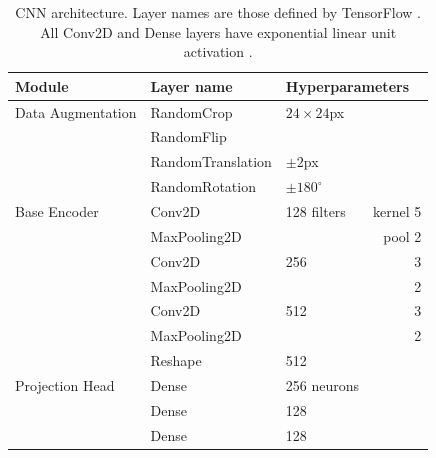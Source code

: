 \documentclass[fleqn,usenatbib]{mnras}
\begin{document}
\begin{table}
	\centering
	\caption{
        CNN architecture.
        Layer names are those defined by TensorFlow \citep{tensorflow}.
        All Conv2D and Dense layers have exponential linear unit activation \citep{elu}.
        }
	\label{tab:architecture}
	\begin{tabular}{lllr}
		\hline
		Module
        &Layer name
        &\multicolumn{2}{l}{Hyperparameters}\\
		\hline
		Data Augmentation
            &RandomCrop&$24\times24$px\\
            &RandomFlip\\
            &RandomTranslation&$\pm2$px\\
            &RandomRotation&$\pm180^\circ$\\
        \hline
        Base Encoder
            &Conv2D & 128 filters & kernel 5\\
            &MaxPooling2D && pool 2\\
            &Conv2D & 256 & 3\\
            &MaxPooling2D && 2\\
            &Conv2D & 512 & 3\\
            &MaxPooling2D && 2\\
            &Reshape & 512\\
        \hline
        Projection Head
            &Dense & 256 neurons\\
            &Dense & 128\\
            &Dense & 128\\
		\hline
	\end{tabular}
\end{table}




\bsp	%
\label{lastpage}
\end{document}
